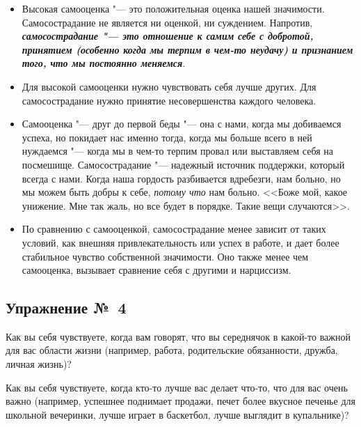 \begin{itemize}
	\item Высокая самооценка "--- это положительная оценка нашей значимости. Самосострадание не является ни оценкой, ни суждением. Напротив, \textbf{\textit{самосострадание "--- это отношение к самим себе с добротой, принятием (особенно когда мы терпим в чем-то неудачу) и признанием того, что мы постоянно меняемся}}.
	\item Для высокой самооценки нужно чувствовать себя лучше других. Для самосострадание нужно принятие несовершенства каждого человека.
	\item Самооценка "--- друг до первой беды "--- она с нами, когда мы добиваемся успеха, но покидает нас именно тогда, когда мы больше всего в ней нуждаемся "--- когда мы в чем-то терпим провал или выставляем себя на посмешище. Самосострадание "--- надежный источник поддержки, который всегда с нами. Когда наша гордость разбивается вдребезги, нам больно, но мы можем быть добры к себе, \emph{потому что} нам больно. <<Боже мой, какое унижение. Мне так жаль, но все будет в порядке. Такие вещи случаются>>.
	\item По сравнению с самооценкой, самосострадание менее зависит от таких условий, как внешняя привлекательность или успех в работе, и дает более стабильное чувство собственной значимости. Оно также менее чем самооценка, вызывает сравнение себя с другими и нарциссизм.
\end{itemize}

\newpage

\subsection{Упражнение №~4}


\vspace{3ex}

Как вы себя чувствуете, когда вам говорят, что вы середнячок в какой-то важной для вас области жизни (например, работа, родительские обязанности, дружба, личная жизнь)?

\vfill

Как вы себя чувствуете, когда кто-то лучше вас делает что-то, что для вас очень важно (например, успешнее поднимает продажи, печет более вкусное печенье для школьной вечеринки, лучше играет в баскетбол, лучше выглядит в купальнике)?

\vfill


